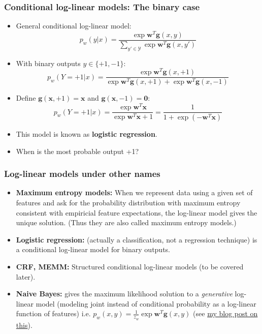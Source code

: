 \documentclass[ignorenonframetext,plain]{beamer}
\renewcommand{\vec}{\mathbf}
\begin{document}
\begin{frame}\frametitle{Conditional log-linear models: The binary case}
\begin{itemize}
\item General conditional log-linear model:\[
  p_w(y|x) = \frac{\exp \vec{w}^T \vec{g}(x, y)}
  {\sum_{y'\in\mathcal{Y}} \exp \vec{w}^T \vec{g}(x, y')}
\]
\item With binary outputs $y\in\{+1,-1\}$:\[
  p_w(Y=+1|x) = \frac{\exp \vec{w}^T \vec{g}(x, +1)}
  {\exp \vec{w}^T \vec{g}(x, +1)+\exp \vec{w}^T \vec{g}(x, -1)}
\]
\item Define $\vec{g}(\vec{x}, +1) = \vec{x}$ and $\vec{g}(\vec{x}, -1) = \vec{0}$:\[
  p_w(Y=+1|x) =
  \frac{\exp \vec{w}^T \vec{x}}
       {\exp \vec{w}^T \vec{x}+1} =
  \frac{1}{1+\exp(-\vec{w}^T \vec{x})}
\]
\item This model is known as {\bf logistic regression}.
\item When is the most probable output +1?
\end{itemize}  
\end{frame}

\begin{frame}\frametitle{Log-linear models under other names}
\begin{itemize}
\item \textbf{Maximum entropy models:} When we represent data using a
  given set of features and ask for the probability distribution with
  maximum entropy consistent with empiricial feature expectations, the
  log-linear model gives the unique solution.  (Thus they are also
  called maximum entropy models.)
\item \textbf{Logistic regression:} (actually a classification, not a
  regression technique) is a conditional log-linear model for binary
  outputs.
\item \textbf{CRF, MEMM:} Structured conditional log-linear models (to
  be covered later).
\item \textbf{Naive Bayes:} gives the maximum likelihood solution to a
  {\em generative} log-linear model (modeling joint instead of
  conditional probability as a log-linear function of features)
  i.e. $p_w(x,y) = \frac{1}{z_w}\exp \vec{w}^T \vec{g}(x, y)$
  (see
  \href{http://www.denizyuret.com/2010/11/naive-bayes-is-joint-maximum-entropy.html}{my
    blog post on this}).
\end{itemize}
\end{frame}
\end{document}
